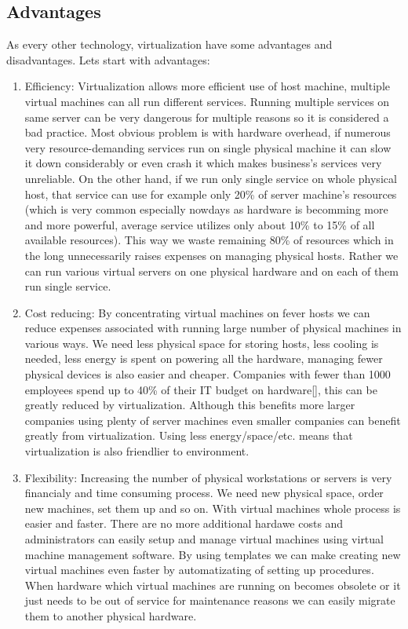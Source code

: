 \begin{enumerate}
\section{Advantages}
As every other technology, virtualization have some advantages and disadvantages. Lets start with advantages:
\begin{enumerate}
\item Efficiency: Virtualization allows more efficient use of host machine, multiple virtual machines can all run different services. Running multiple services on same server can be very dangerous for multiple reasons so it is considered a bad practice. Most obvious problem is with hardware overhead, if numerous very resource-demanding services run on single physical machine it can slow it down considerably or even crash it which makes business's services very unreliable. On the other hand, if we run only single service on whole physical host, that service can use for example only 20\% of server machine's resources (which is very common especially nowdays as hardware is becomming more and more powerful, average service utilizes only about 10\% to 15\% of all available resources). This way we waste remaining 80\% of resources which in the long unnecessarily raises expenses on managing physical hosts. Rather we can run various virtual servers on one physical hardware and on each of them run single service.
\item Cost reducing: By concentrating virtual machines on fever hosts we can reduce expenses associated with running large number of physical machines in various ways. We need less physical space for storing hosts, less cooling is needed, less energy is spent on powering all the hardware, managing fewer physical devices is also easier and cheaper. Companies with fewer than 1000 employees spend up to 40\% of their IT budget on hardware[], this can be greatly reduced by virtualization. Although this benefits more larger companies using plenty of server machines even smaller companies can benefit greatly from virtualization. Using less energy/space/etc. means that virtualization is also friendlier to environment.
\item Flexibility: Increasing the number of physical workstations or servers is very financialy and time consuming process. We need new physical space, order new machines, set them up and so on. With virtual machines whole process is easier and faster. There are no more additional hardawe costs and administrators can easily setup and manage virtual machines using virtual machine management software. By using templates we can make creating new virtual machines even faster by automatizating of setting up procedures. When hardware which virtual machines are running on becomes obsolete or it just needs to be out of service for maintenance reasons we can easily migrate them to another physical hardware.

\end{enumerate}
\end{enumerate}
